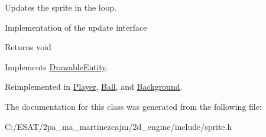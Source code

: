 Updates the sprite in the loop. 

Implementation of the update interface

\begin{DoxyReturn}{Returns}
void 
\end{DoxyReturn}


Implements \hyperlink{class_drawable_entity_acbf8317de062a2e0e79f646dbe75249c}{Drawable\+Entity}.



Reimplemented in \hyperlink{class_player_abe7d0a24ffd93ba0bc4eea860b10eb09}{Player}, \hyperlink{class_ball_a26c877660343d086a9d45891659474f8}{Ball}, and \hyperlink{class_background_af4a37c0ac474de5f65130cbef3d61379}{Background}.



The documentation for this class was generated from the following file\+:\begin{DoxyCompactItemize}
\item 
C\+:/\+E\+S\+A\+T/2pa\+\_\+ma\+\_\+martinezcajm/2d\+\_\+engine/include/sprite.\+h\end{DoxyCompactItemize}
